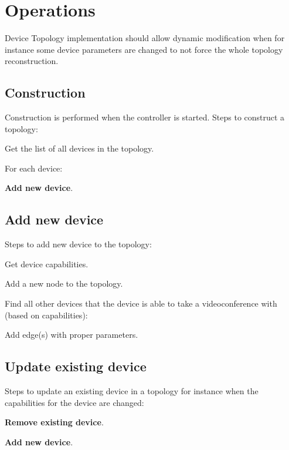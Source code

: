 \documentclass[a4paper]{report}
\begin{document}
\section{Operations}

Device Topology implementation should allow dynamic modification when for instance some device parameters are changed to not force the whole topology reconstruction.      
      
\subsection*{Construction}

Construction is performed when the controller is started. Steps to construct a topology:

\begin{compactenum}
\item Get the list of all devices in the topology.
\item For each device: 
  \begin{compactitem}
  \item \textbf{Add new device}.
  \end{compactitem}
\end{compactenum}     

\subsection*{Add new device}     

Steps to add new device to the topology:
\begin{compactenum}
\item Get device capabilities.
\item Add a new node to the topology.
\item Find all other devices that the device is able to take a videoconference with (based on capabilities):
   \begin{compactitem}
   \item Add edge(s) with proper parameters.
   \end{compactitem}
\end{compactenum}  

\subsection*{Update existing device}     

Steps to update an existing device in a topology for instance when the capabilities for the device are changed:
\begin{compactenum}
\item \textbf{Remove existing device}.
\item \textbf{Add new device}.
\end{compactenum} 
     
\end{document}
